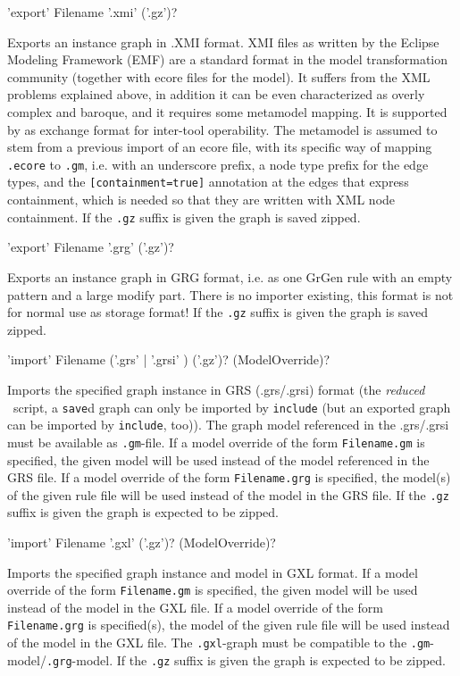 \begin{rail}
  'export' Filename '.xmi' ('.gz')?
\end{rail}
Exports an instance graph in .XMI format.
XMI files as written by the Eclipse Modeling Framework (EMF) are a standard format in the model transformation community (together with ecore files for the model).
It suffers from the XML problems explained above, in addition it can be even characterized as overly complex and baroque, and it requires some metamodel mapping.
It is supported by \GrG{} as exchange format for inter-tool operability.
The metamodel is assumed to stem from a previous import of an ecore file, with its specific way of mapping \texttt{.ecore} to \texttt{.gm}, i.e. with an underscore prefix, a node type prefix for the edge types, and the \verb#[containment=true]# annotation at the edges that express containment, which is needed so that they are written with XML node containment.
If the \texttt{.gz} suffix is given the graph is saved zipped.


\begin{rail}
  'export' Filename '.grg' ('.gz')?
\end{rail}
Exports an instance graph in GRG format, i.e. as one GrGen rule with an empty pattern and a large modify part.
There is no importer existing, this format is not for normal use as storage format!
If the \texttt{.gz} suffix is given the graph is saved zipped.

\begin{rail}
  'import' Filename ('.grs' | '.grsi' ) ('.gz')? (ModelOverride)?
\end{rail}
Imports the specified graph instance in GRS (.grs/.grsi) format (the \emph{reduced} \GrShell\ script,
a \texttt{save}d graph can only be imported by \texttt{include} (but an exported graph can be imported by \texttt{include}, too)).
The graph model referenced in the .grs/.grsi must be available as \texttt{.gm}-file.
If a model override of the form \texttt{Filename.gm} is specified, the given model will be used instead of the model referenced in the GRS file.
If a model override of the form \texttt{Filename.grg} is specified, the model(s) of the given rule file will be used instead of the model in the GRS file.
If the \texttt{.gz} suffix is given the graph is expected to be zipped.

\begin{rail}
  'import' Filename '.gxl' ('.gz')? (ModelOverride)?
\end{rail}
Imports the specified graph instance and model in GXL format.
If a model override of the form \texttt{Filename.gm} is specified, the given model will be used instead of the model in the GXL file.
If a model override of the form \texttt{Filename.grg} is specified(s), the model of the given rule file will be used instead of the model in the GXL file.
The \texttt{.gxl}-graph must be compatible to the \texttt{.gm}-model/\texttt{.grg}-model.
If the \texttt{.gz} suffix is given the graph is expected to be zipped.

